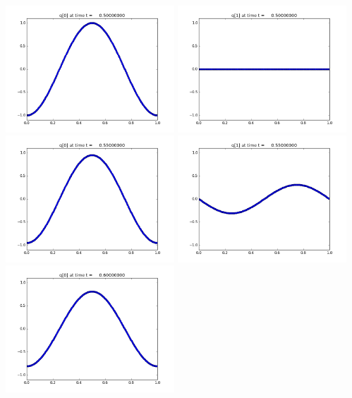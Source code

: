 \documentclass[11pt]{article}
\begin{document}
\vskip 10pt 
\includegraphics[width=0.475\textwidth]{frame0010fig0.png}
\includegraphics[width=0.475\textwidth]{frame0010fig1.png}
\vskip 10pt 
\includegraphics[width=0.475\textwidth]{frame0011fig0.png}
\includegraphics[width=0.475\textwidth]{frame0011fig1.png}
\vskip 10pt 
\includegraphics[width=0.475\textwidth]{frame0012fig0.png}
\end{document}
